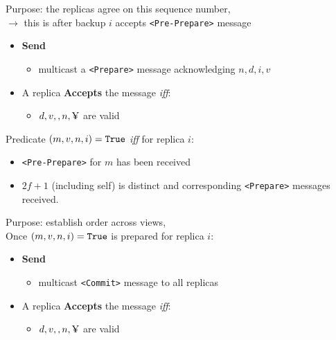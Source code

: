 \documentclass{easyclass}
\begin{document}
\begin{prf}[Prepare]{}
    Purpose: the replicas agree on this sequence number, \\
    $\rightarrow$ this is after backup $i$ accepts \texttt{<Pre-Prepare>} message
    \begin{itemize}
        \item \textbf{Send}
        \begin{itemize}
            \item multicast a \texttt{<Prepare>} message acknowledging $n,d,i,v$
        \end{itemize}
        \item A replica \textbf{Accepts} the message \emph{iff}:
        \begin{itemize}
            \item $d,v,,n,\text{\textyen}$ are valid
        \end{itemize}
    \end{itemize}
\end{prf}

\begin{prf}[Prepared]{}
    Predicate $(m,v,n,i) = \text{\texttt{True}}$ \emph{iff} for replica $i$:
    \begin{itemize}
        \item \texttt{<Pre-Prepare>} for $m$ has been received
        \item $2f+1$ (including self) is distinct and 
        corresponding \texttt{<Prepare>} messages received.
    \end{itemize}
\end{prf}

\begin{prf}[Commit]{}
    Purpose: establish order across views, \\
    Once $(m,v,n,i) = \text{\texttt{True}}$ is prepared for replica $i$:
    \begin{itemize}
        \item \textbf{Send}
        \begin{itemize}
            \item multicast \texttt{<Commit>} message to all replicas
        \end{itemize}
        \item A replica \textbf{Accepts} the message \emph{iff}:
        \begin{itemize}
            \item $d,v,,n,\text{\textyen}$ are valid    
        \end{itemize}
    \end{itemize}
\end{prf}
\end{document}
